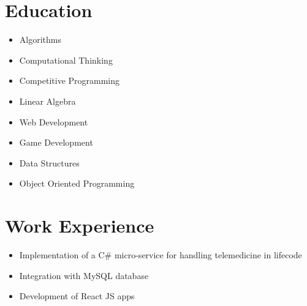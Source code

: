 \documentclass[11pt,a4paper,sans]{moderncv}        %
\begin{document}
\vspace*{-1.05mm}
\makecvtitle
\vspace*{-10mm}

\section{Education}
{}{}
\vspace{-1.5em}\begin{small}
 \begin{multicols}{2}
    \begin{itemize}
\item Algorithms
\item Computational Thinking
\item Competitive Programming
\item Linear Algebra

    \end{itemize}
\end{multicols}\end{small}

\vspace{+1.0em}

{}{}
\vspace{-1.5em}\begin{small}
 \begin{multicols}{2}
    \begin{itemize}
\item Web Development
\item Game Development
\item Data Structures 
\item Object Oriented Programming
    \end{itemize}
\end{multicols}\end{small}

\section{Work Experience}
\vspace{-1.5em}\begin{small}
    \begin{itemize}
\item Implementation of a C\# micro-service for handling telemedicine in lifecode 
\item Integration with MySQL database 
\item Development of React JS apps 
    \end{itemize}
\end{small}
\end{document}
